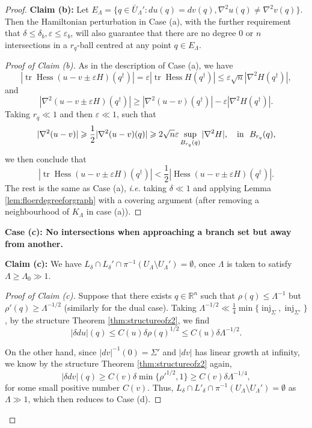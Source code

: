 \documentclass[11pt,a4paper]{article}
\numberwithin{equation}{section}%
\theoremstyle{definition}
\newcommand{\ie}{\emph{i.e.} }
\newcommand{\R}{\mathbb{R}}
\begin{document}
\begin{proof}
\textbf{Claim (b):} Let $E_{\Lambda}=\{q\in \bar U_\Lambda':du(q)=dv(q),\nabla^2u(q)\neq \nabla^2v(q)\}$. Then the Hamiltonian perturbation in Case (a), with the further requirement that $\delta\leqslant \delta_b,\varepsilon\leqslant \varepsilon_b$, will also guarantee that there are no degree $0$ or $n$ intersections in a $r_q$-ball centred at any point $q\in E_\Lambda$. 
\begin{proof}[Proof of Claim (b)]
As in the description of Case (a), we have
$$\left|\operatorname{tr}\operatorname{Hess}(u-v\pm \varepsilon H)(q^\dagger)\right|=\varepsilon\left|\operatorname{tr}\operatorname{Hess}H(q^\dagger)\right|\leqslant \varepsilon \sqrt{n}|\nabla^2H(q^\dagger)|,$$
and $$|\nabla^2(u-v\pm \varepsilon H)(q^\dagger)|\geqslant |\nabla^2(u-v)(q^\dagger)|-\varepsilon |\nabla^2H(q^\dagger)|.$$ 
Taking $r_q\ll1$ and then $\varepsilon\ll1$, such that $$|\nabla^2(u-v)|\geqslant \frac{1}{2}|\nabla^2(u-v)(q)|\geqslant2\sqrt{n}\varepsilon\sup\limits_{B_{r_q}(q)}|\nabla^2H|,\quad \textnormal{in}~~B_{r_q}(q),$$
we then conclude that 
$$|\operatorname{tr}\operatorname{Hess}(u-v\pm \varepsilon H)(q^\dagger)|<\frac{1}{2}|\operatorname{Hess}(u-v\pm \varepsilon H)(q^\dagger)|.$$
The rest is the same as Case (a), \ie taking $\delta\ll 1$ and applying Lemma \ref{lem:floerdegreeforgraph} with a covering argument (after removing a neighbourhood of $K_\Lambda$ in case (a)). 
\end{proof}
 \textbf{Case (c): No intersections when approaching a branch set but away from another.}

\textbf{Claim (c):} We have $L_\delta \cap L_{\delta}'\cap \pi^{-1}(U_\Lambda\setminus U_{\Lambda}')=\emptyset$, once $\Lambda$ is taken to satisfy $\Lambda\geqslant \Lambda_0\gg 1$. 

 \begin{proof}[Proof of Claim (c)]  
    Suppose that there exists $q\in \R^n$ such that $\rho(q)\leqslant \Lambda^{-1}$ but $\rho'(q)\geqslant \Lambda^{-1/2}$ (similarly for the dual case). Taking $\Lambda^{-1/2}\ll \frac{1}{4}\min \{\operatorname{inj}_\Sigma,\operatorname{inj}_{\Sigma'}\}$, by the structure Theorem \ref{thm:structureofz2}, we find 
    $$|\delta du|(q)\leqslant C(u)\delta\rho(q)^{1/2}\leqslant C(u)\delta\Lambda^{-1/2}.$$
    
    On the other hand, since $|dv|^{-1}(0)=\Sigma'$ and $|dv|$ has linear growth at infinity, we know by the structure Theorem \ref{thm:structureofz2} again, 
    $$|\delta dv|(q)\geqslant C(v)\delta\min \{\rho'^{1/2},1\}\geqslant C(v)\delta\Lambda^{-1/4},$$
    for some small positive number $C(v)$. Thus, $L_{\delta}\cap L'_{\delta}\cap \pi^{-1}(U_{\Lambda}\setminus U_{\Lambda}')=\emptyset$ as $\Lambda\gg 1$, which then reduces to Case (d). 
    \end{proof}


\end{proof}
\end{document}
